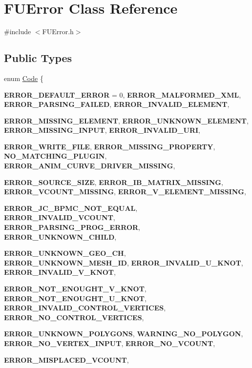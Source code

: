 \hypertarget{classFUError}{
\section{FUError Class Reference}
\label{classFUError}
}


{\ttfamily \#include $<$FUError.h$>$}

\subsection*{Public Types}
\begin{DoxyCompactItemize}
\item 
enum \hyperlink{classFUError_adb409c35dc05786e6742818fc7643d7d}{Code} \{ \par
{\bfseries ERROR\_\-DEFAULT\_\-ERROR} =  0, 
{\bfseries ERROR\_\-MALFORMED\_\-XML}, 
{\bfseries ERROR\_\-PARSING\_\-FAILED}, 
{\bfseries ERROR\_\-INVALID\_\-ELEMENT}, 
\par
{\bfseries ERROR\_\-MISSING\_\-ELEMENT}, 
{\bfseries ERROR\_\-UNKNOWN\_\-ELEMENT}, 
{\bfseries ERROR\_\-MISSING\_\-INPUT}, 
{\bfseries ERROR\_\-INVALID\_\-URI}, 
\par
{\bfseries ERROR\_\-WRITE\_\-FILE}, 
{\bfseries ERROR\_\-MISSING\_\-PROPERTY}, 
{\bfseries NO\_\-MATCHING\_\-PLUGIN}, 
{\bfseries ERROR\_\-ANIM\_\-CURVE\_\-DRIVER\_\-MISSING}, 
\par
{\bfseries ERROR\_\-SOURCE\_\-SIZE}, 
{\bfseries ERROR\_\-IB\_\-MATRIX\_\-MISSING}, 
{\bfseries ERROR\_\-VCOUNT\_\-MISSING}, 
{\bfseries ERROR\_\-V\_\-ELEMENT\_\-MISSING}, 
\par
{\bfseries ERROR\_\-JC\_\-BPMC\_\-NOT\_\-EQUAL}, 
{\bfseries ERROR\_\-INVALID\_\-VCOUNT}, 
{\bfseries ERROR\_\-PARSING\_\-PROG\_\-ERROR}, 
{\bfseries ERROR\_\-UNKNOWN\_\-CHILD}, 
\par
{\bfseries ERROR\_\-UNKNOWN\_\-GEO\_\-CH}, 
{\bfseries ERROR\_\-UNKNOWN\_\-MESH\_\-ID}, 
{\bfseries ERROR\_\-INVALID\_\-U\_\-KNOT}, 
{\bfseries ERROR\_\-INVALID\_\-V\_\-KNOT}, 
\par
{\bfseries ERROR\_\-NOT\_\-ENOUGHT\_\-V\_\-KNOT}, 
{\bfseries ERROR\_\-NOT\_\-ENOUGHT\_\-U\_\-KNOT}, 
{\bfseries ERROR\_\-INVALID\_\-CONTROL\_\-VERTICES}, 
{\bfseries ERROR\_\-NO\_\-CONTROL\_\-VERTICES}, 
\par
{\bfseries ERROR\_\-UNKNOWN\_\-POLYGONS}, 
{\bfseries WARNING\_\-NO\_\-POLYGON}, 
{\bfseries ERROR\_\-NO\_\-VERTEX\_\-INPUT}, 
{\bfseries ERROR\_\-NO\_\-VCOUNT}, 
\par
{\bfseries ERROR\_\-MISPLACED\_\-VCOUNT}, 

\end{DoxyCompactItemize}
